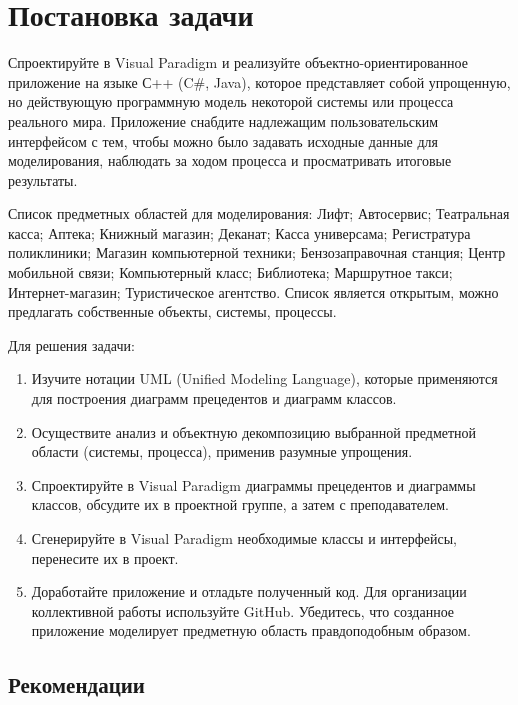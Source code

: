 \section{Постановка задачи}

Спроектируйте в Visual Paradigm и реализуйте объектно-ориентированное приложение на языке С++ (C\#, Java), которое представляет собой упрощенную, но действующую программную модель некоторой системы или процесса реального мира.
Приложение снабдите надлежащим пользовательским интерфейсом с тем, чтобы можно было задавать исходные данные для моделирования, наблюдать за ходом процесса и просматривать итоговые результаты. 

Список предметных областей для моделирования: Лифт; Автосервис; Театральная касса; Аптека; Книжный магазин; Деканат; Касса универсама; Регистратура поликлиники; Магазин компьютерной техники; Бензозаправочная станция;  Центр мобильной связи;  Компьютерный класс; Библиотека; Маршрутное такси; Интернет-магазин; Туристическое агентство. 
Список является открытым, можно предлагать собственные объекты, системы, процессы. 

Для решения задачи: 
\begin{enumerate}
\item  Изучите нотации UML (Unified Modeling Language), которые применяются для построения диаграмм прецедентов и диаграмм классов.

\item Осуществите анализ и объектную декомпозицию выбранной предметной области  (системы, процесса), применив разумные упрощения. 

\item Спроектируйте в Visual Paradigm диаграммы прецедентов и диаграммы классов, обсудите их в проектной группе, а затем с преподавателем. 

\item Сгенерируйте в Visual Paradigm необходимые классы и интерфейсы, перенесите их в проект. 

\item Доработайте приложение и отладьте полученный код.
Для организации коллективной работы используйте GitHub. 
Убедитесь, что созданное приложение моделирует предметную область правдоподобным образом. 
\end{enumerate}

\subsection{Рекомендации}

